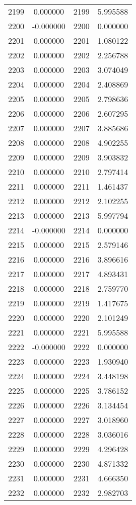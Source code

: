 \documentclass[12pt]{article}
\begin{document}
\begin{longtable}{@{}cccc@{}}
2199 & 0.000000 & 2199 & 5.995588 \\
2200 & -0.000000 & 2200 & 0.000000 \\
2201 & 0.000000 & 2201 & 1.080122 \\
2202 & 0.000000 & 2202 & 2.256788 \\
2203 & 0.000000 & 2203 & 3.074049 \\
2204 & 0.000000 & 2204 & 2.408869 \\
2205 & 0.000000 & 2205 & 2.798636 \\
2206 & 0.000000 & 2206 & 2.607295 \\
2207 & 0.000000 & 2207 & 3.885686 \\
2208 & 0.000000 & 2208 & 4.902255 \\
2209 & 0.000000 & 2209 & 3.903832 \\
2210 & 0.000000 & 2210 & 2.797414 \\
2211 & 0.000000 & 2211 & 1.461437 \\
2212 & 0.000000 & 2212 & 2.102255 \\
2213 & 0.000000 & 2213 & 5.997794 \\
2214 & -0.000000 & 2214 & 0.000000 \\
2215 & 0.000000 & 2215 & 2.579146 \\
2216 & 0.000000 & 2216 & 3.896616 \\
2217 & 0.000000 & 2217 & 4.893431 \\
2218 & 0.000000 & 2218 & 2.759770 \\
2219 & 0.000000 & 2219 & 1.417675 \\
2220 & 0.000000 & 2220 & 2.101249 \\
2221 & 0.000000 & 2221 & 5.995588 \\
2222 & -0.000000 & 2222 & 0.000000 \\
2223 & 0.000000 & 2223 & 1.930940 \\
2224 & 0.000000 & 2224 & 3.448198 \\
2225 & 0.000000 & 2225 & 3.786152 \\
2226 & 0.000000 & 2226 & 3.134454 \\
2227 & 0.000000 & 2227 & 3.018960 \\
2228 & 0.000000 & 2228 & 3.036016 \\
2229 & 0.000000 & 2229 & 4.296428 \\
2230 & 0.000000 & 2230 & 4.871332 \\
2231 & 0.000000 & 2231 & 4.666350 \\
2232 & 0.000000 & 2232 & 2.982703 \\

\end{longtable}
\end{document}
